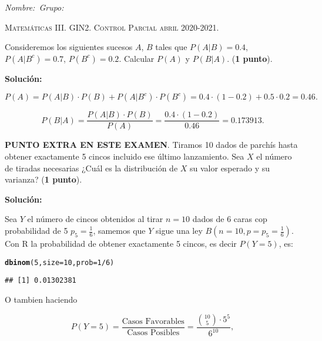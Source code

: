 \documentclass[12pt]{article}\usepackage[]{graphicx}\usepackage[]{color}
\makeatletter
\newcommand{\hlnum}[1]{\textcolor[rgb]{0.686,0.059,0.569}{#1}}%
\newcommand{\hlopt}[1]{\textcolor[rgb]{0,0,0}{#1}}%
\newcommand{\hlstd}[1]{\textcolor[rgb]{0.345,0.345,0.345}{#1}}%
\newcommand{\hlkwc}[1]{\textcolor[rgb]{0.333,0.667,0.333}{#1}}%
\newcommand{\hlkwd}[1]{\textcolor[rgb]{0.737,0.353,0.396}{\textbf{#1}}}%
\newenvironment{kframe}{%
 \def\at@end@of@kframe{}%
 \ifinner\ifhmode%
  \def\at@end@of@kframe{\end{minipage}}%
  \begin{minipage}{\columnwidth}%
 \fi\fi%
 \def\FrameCommand##1{\hskip\@totalleftmargin \hskip-\fboxsep
 \colorbox{shadecolor}{##1}\hskip-\fboxsep
     \hskip-\linewidth \hskip-\@totalleftmargin \hskip\columnwidth}%
 \MakeFramed {\advance\hsize-\width
   \@totalleftmargin\z@ \linewidth\hsize
   \@setminipage}}%
 {\par\unskip\endMakeFramed%
 \at@end@of@kframe}
\newenvironment{knitrout}{}{} %
\newcounter{problemes}
\newcounter{punts} \def\thepunts{\arabic{punts}}
\def\probl{\addtocounter{problemes}{1} \setcounter{punts}{0}
\medskip\noindent{\bf \theproblemes) }}
\makeatother
\begin{document}
\noindent\emph{Nombre:}\hfill\hfill\hfill\hfill\hfill\hfill\hfill\ \emph{Grupo:}\hfill \vspace*{-2ex}

\begin{center}
\textsc{Matemáticas III. GIN2. Control Parcial abril  2020-2021.}
\end{center}

\setcounter{problemes}{0}

\probl  Consideremos los siguientes sucesos $A$, $B$ tales que
$P(A|B)=0.4$, $P(A|B^c)=0.7$, $P(B^c)=0.2$. Calcular $P(A)$ y $P(B|A)$.
(\textbf{1 punto}).

\textbf{Solución:}




$$P(A)=P(A|B)\cdot P(B)+P(A|B^c)\cdot P(B^c)=0.4\cdot (1-0.2)+ 0.5\cdot 0.2=0.46.$$

$$P(B|A)=\frac{P(A|B)\cdot P(B)}{P(A)}=\frac{0.4\cdot (1-0.2)}{0.46}=0.173913.$$


\probl \textbf{\textsc{PUNTO EXTRA EN ESTE EXAMEN}}. Tiramos 10 dados de parchís hasta obtener exactamente 5 cincos incluido ese último lanzamiento.
Sea $X$  el número de tiradas necesarias ¿Cuál es la distribución de $X$ su valor esperado y su varianza? (\textbf{1 punto}).

\textbf{Solución:}

Sea $Y$ el número de cincos obtenidos al tirar $n=10$ dados de 6 caras cop probabilidad de 5 $p_5=\frac{1}{6}$, samemos que $Y$ sigue una ley $B(n=10,p=p_5=\frac{1}{6})$.  Con R la probabilidad de obtener exactamente 5 cincos, es decir  $P(Y=5)$, es:

\begin{knitrout}
\color{fgcolor}\begin{kframe}
\begin{alltt}
\hlkwd{dbinom}\hlstd{(}\hlnum{5}\hlstd{,}\hlkwc{size}\hlstd{=}\hlnum{10}\hlstd{,}\hlkwc{prob}\hlstd{=}\hlnum{1}\hlopt{/}\hlnum{6}\hlstd{)}
\end{alltt}
\begin{verbatim}
## [1] 0.01302381
\end{verbatim}
\end{kframe}
\end{knitrout}

O tambien haciendo 

$$P(Y=5)=\frac{\mbox{Casos Favorables}}{\mbox{Casos Posibles}}
= \frac{{10 \choose 5}\cdot 5^5}{6^{10}},$$
\end{document}
